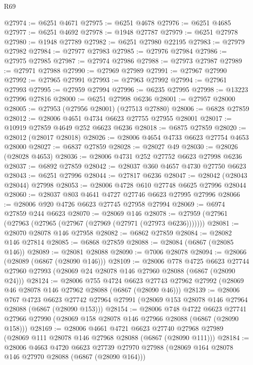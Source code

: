 \begin{lexlean}{R69}
\begin{coremodule}
{@27974 := @6251 @4671
@27975 := @6251 @4678
@27976 := @6251 @4685
@27977 := @6251 @4692
@27978 := @1948 @27787
@27979 := @6251 @27978
@27980 := @1948 @27789
@27982 := @6251 @27980 @22195
@27983 := @27979 @27982
@27984 := @27977 @27983
@27985 := @27976 @27984
@27986 := @27975 @27985
@27987 := @27974 @27986
@27988 := @27973 @27987
@27989 := @27971 @27988
@27990 := @27969 @27989
@27991 := @27967 @27990
@27992 := @27965 @27991
@27993 := @27963 @27992
@27994 := @27961 @27993
@27995 := @27959 @27994
@27996 := @6235 @27995
@27998 := @13223 @27996 @27816
@28000 := @6251 @27998 @6236
@28001 := @27957 @28000
@28005 := @27953 (@27956 @28001) (@27513 @27880)
@28006 := @6828 @27859
@28012 := @28006 @4651 @4734 @6623 @27755 @27955 @28001
@28017 := @10919 @27859 @4649 @252 @6623 @6236
@28018 := @6875 @27859
@28020 := @28012 (@28017 @28018)
@28026 := @28006 @4654 @4733 @6623 @27754 @4653 @28000
@28027 := @6837 @27859
@28028 := @28027 @49
@28030 := @28026 (@28028 @4653)
@28036 := @28006 @4731 @252 @27752 @6623 @27998 @6236
@28037 := @6892 @27859
@28042 := @28037 @360 @4657 @4730 @27750 @6623
@28043 := @6251 @27996
@28044 := @27817 @6236
@28047 := @28042 (@28043 @28044) @27998
@28053 := @28006 @4728 @610 @27748 @6625 @27996 @28044
@28060 := @28037 @803 @4641 @4727 @27746 @6623 @27995 @27996
@28066 := @28006 @920 @4726 @6623 @27745 @27958 @27994
@28069 := @6974 @27859 @244 @6623
@28070 := @28069 @146
@28078 := @27959 (@27961 (@27963 (@27965 (@27967 (@27969 (@27971 (@27973 @6236)))))))
@28081 := @28070 @28078 @146 @27958
@28082 := @6862 @27859
@28084 := @28082 @146 @27814
@28085 := @6868 @27859
@28088 := @28084 (@6867 (@28085 @146))
@28089 := @28081 @28088
@28090 := @7006 @28078
@28094 := @28066 (@28089 (@6867 (@28090 @146)))
@28109 := @28006
    @778
    @4725
    @6623
    @27744
    @27960
    @27993
    (@28069 @24 @28078 @146 @27960 @28088 (@6867 (@28090 @24)))
@28124 := @28006
    @755
    @4724
    @6623
    @27743
    @27962
    @27992
    (@28069 @46 @28078 @146 @27962 @28088 (@6867 (@28090 @46)))
@28139 := @28006
    @767
    @4723
    @6623
    @27742
    @27964
    @27991
    (@28069 @153 @28078 @146 @27964 @28088 (@6867 (@28090 @153)))
@28154 := @28006
    @748
    @4722
    @6623
    @27741
    @27966
    @27990
    (@28069 @158 @28078 @146 @27966 @28088 (@6867 (@28090 @158)))
@28169 := @28006
    @4661
    @4721
    @6623
    @27740
    @27968
    @27989
    (@28069 @111 @28078 @146 @27968 @28088 (@6867 (@28090 @111)))
@28184 := @28006
    @4663
    @4720
    @6623
    @27739
    @27970
    @27988
    (@28069 @164 @28078 @146 @27970 @28088 (@6867 (@28090 @164)))
}
\end{coremodule}
\end{lexlean}
